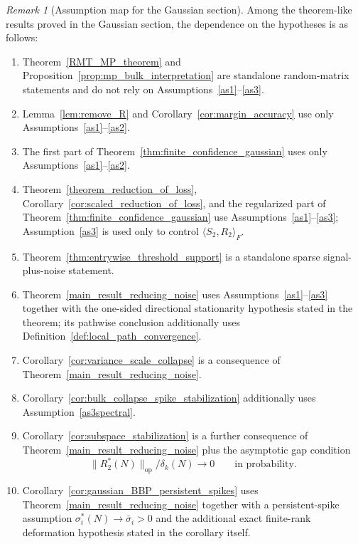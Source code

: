 \documentclass[11pt]{article}
\theoremstyle{plain}
\theoremstyle{definition}
\theoremstyle{remark}
\newtheorem{rem}[thm]{Remark}
\newcommand{\op}{\mathrm{op}}
\newcommand{\1}{\mathbf{1}}
\begin{document}
\begin{rem}[Assumption map for the Gaussian section]
Among the theorem-like results proved in the Gaussian section, the dependence on the hypotheses is as follows:
\begin{enumerate}[leftmargin=2em]
\item Theorem~\ref{RMT_MP_theorem} and Proposition~\ref{prop:mp_bulk_interpretation} are standalone random-matrix statements and do not rely on Assumptions~\ref{as1}--\ref{as3}.
\item Lemma~\ref{lem:remove_R} and Corollary~\ref{cor:margin_accuracy} use only Assumptions~\ref{as1}--\ref{as2}.
\item The first part of Theorem~\ref{thm:finite_confidence_gaussian} uses only Assumptions~\ref{as1}--\ref{as2}.
\item Theorem~\ref{theorem_reduction_of_loss}, Corollary~\ref{cor:scaled_reduction_of_loss}, and the regularized part of Theorem~\ref{thm:finite_confidence_gaussian} use Assumptions~\ref{as1}--\ref{as3}; Assumption~\ref{as3} is used only to control \(\langle S_2,R_2\rangle_F\).
\item Theorem~\ref{thm:entrywise_threshold_support} is a standalone sparse signal-plus-noise statement.
\item Theorem~\ref{main_result_reducing_noise} uses Assumptions~\ref{as1}--\ref{as3} together with the one-sided directional stationarity hypothesis stated in the theorem; its pathwise conclusion additionally uses Definition~\ref{def:local_path_convergence}.
\item Corollary~\ref{cor:variance_scale_collapse} is a consequence of Theorem~\ref{main_result_reducing_noise}.
\item Corollary~\ref{cor:bulk_collapse_spike_stabilization} additionally uses Assumption~\ref{as3spectral}.
\item Corollary~\ref{cor:subspace_stabilization} is a further consequence of Theorem~\ref{main_result_reducing_noise} plus the asymptotic gap condition
\[
\|R_2^*(N)\|_{\op}/\delta_k(N)\to0
\qquad\text{in probability.}
\]
\item Corollary~\ref{cor:gaussian_BBP_persistent_spikes} uses Theorem~\ref{main_result_reducing_noise} together with a persistent-spike assumption \(\sigma_i^*(N)\to\bar\sigma_i>0\) and the additional exact finite-rank deformation hypothesis stated in the corollary itself.
\end{enumerate}
\end{rem}
\end{document}
